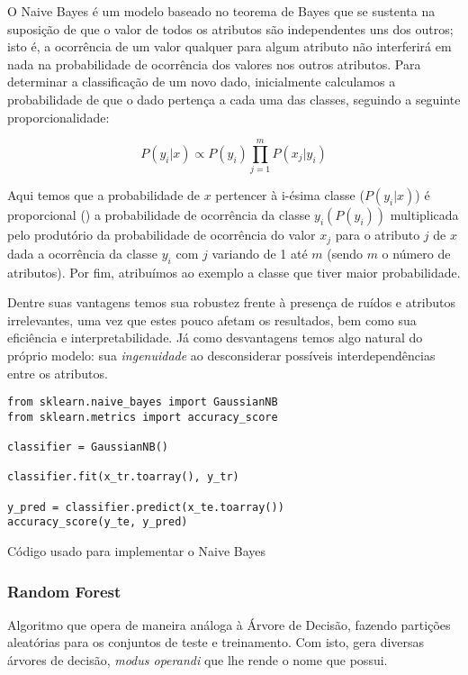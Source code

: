 \documentclass[]{IEEEphot}
\begin{document}
O Naive Bayes é um modelo baseado no teorema de Bayes que se sustenta na suposição de que o valor de todos os atributos são independentes uns dos outros; isto é, a ocorrência de um valor qualquer para algum atributo não interferirá em nada na probabilidade de ocorrência dos valores nos outros atributos. Para determinar a classificação de um novo dado, inicialmente calculamos a probabilidade de que o dado pertença a cada uma das classes, seguindo a seguinte proporcionalidade:

\begin{equation}
    P(y_i|x) \propto P(y_i) \prod_{j=1}^m P(x_j | y_i)
\end{equation}

Aqui temos que a probabilidade de $x$ pertencer à i-ésima classe ($P(y_i|x)$) é proporcional (\propto) a probabilidade de ocorrência da classe $y_i (P(y_i))$ multiplicada pelo produtório da probabilidade de ocorrência do valor $x_j$ para o atributo $j$ de $x$ dada a ocorrência da classe $y_i$ com $j$ variando de 1 até $m$ (sendo $m$ o número de atributos). Por fim, atribuímos ao exemplo a classe que tiver maior probabilidade.

Dentre suas vantagens temos sua robustez frente à presença de ruídos e atributos irrelevantes, uma vez que estes pouco afetam os resultados, bem como sua eficiência e interpretabilidade. Já como desvantagens temos algo natural do próprio modelo: sua \textit{ingenuidade} ao desconsiderar possíveis interdependências entre os atributos.

\begin{listing}[!ht]
\begin{verbatim}
from sklearn.naive_bayes import GaussianNB
from sklearn.metrics import accuracy_score

classifier = GaussianNB()

classifier.fit(x_tr.toarray(), y_tr)

y_pred = classifier.predict(x_te.toarray())
accuracy_score(y_te, y_pred)
\end{verbatim}

\caption{Código usado para implementar o Naive Bayes}

\end{listing}

\subsubsection{Random Forest}

Algoritmo que opera de maneira análoga à Árvore de Decisão, fazendo partições aleatórias para os conjuntos de teste e treinamento. Com isto, gera diversas árvores de decisão, \textit{modus operandi} que lhe rende o nome que possui.
\end{document}
